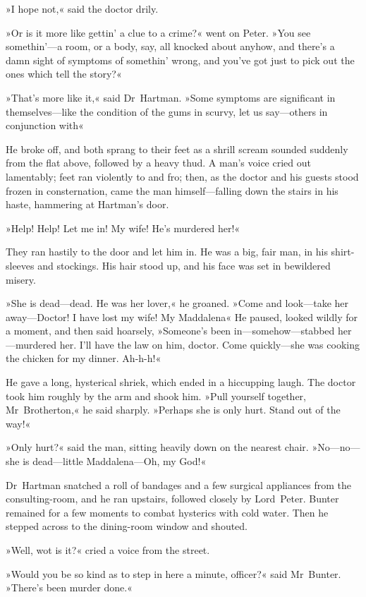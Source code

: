 »I hope not,« said the doctor drily.

»Or is it more like gettin' a clue to a crime?« went on Peter. »You see somethin'—a room, or a body, say, all knocked about anyhow, and there's a damn sight of symptoms of somethin' wrong, and you've got just to pick out the ones which tell the story?«

»That's more like it,« said Dr~Hartman. »Some symptoms are significant in themselves—like the condition of the gums in scurvy, let us say—others in conjunction with\longdash«

He broke off, and both sprang to their feet as a shrill scream sounded suddenly from the flat above, followed by a heavy thud. A man's voice cried out lamentably; feet ran violently to and fro; then, as the doctor and his guests stood frozen in consternation, came the man himself—falling down the stairs in his haste, hammering at Hartman's door.

»Help! Help! Let me in! My wife! He's murdered her!«

They ran hastily to the door and let him in. He was a big, fair man, in his shirt-sleeves and stockings. His hair stood up, and his face was set in bewildered misery.

»She is dead—dead. He was her lover,« he groaned. »Come and look—take her away—Doctor! I have lost my wife! My Maddalena\longdash« He paused, looked wildly for a moment, and then said hoarsely, »Someone's been in—somehow—stabbed her—murdered her. I'll have the law on him, doctor. Come quickly—she was cooking the chicken for my dinner. Ah-h-h!«

He gave a long, hysterical shriek, which ended in a hiccupping laugh. The doctor took him roughly by the arm and shook him. »Pull yourself together, Mr~Brotherton,« he said sharply. »Perhaps she is only hurt. Stand out of the way!«

»Only hurt?« said the man, sitting heavily down on the nearest chair. »No—no—she is dead—little Maddalena—Oh, my God!«

Dr~Hartman snatched a roll of bandages and a few surgical appliances from the consulting-room, and he ran upstairs, followed closely by Lord~Peter. Bunter remained for a few moments to combat hysterics with cold water. Then he stepped across to the dining-room window and shouted.

»Well, wot is it?« cried a voice from the street.

»Would you be so kind as to step in here a minute, officer?« said Mr~Bunter. »There's been murder done.«

